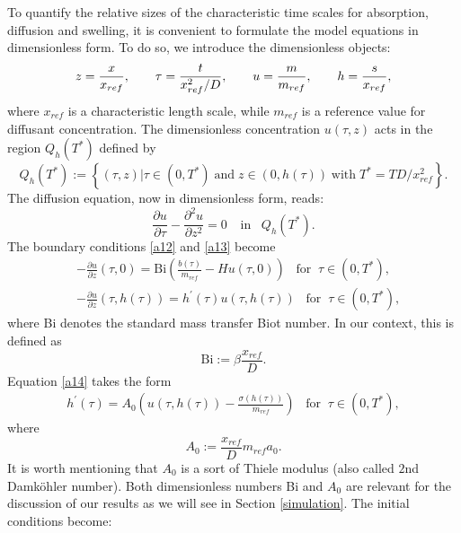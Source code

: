 \documentclass{article}
\begin{document}
To quantify the relative sizes of the characteristic time scales for absorption, diffusion and swelling, it is convenient to formulate the model equations in dimensionless form.  To do so, we introduce the dimensionless objects: 
\begin{align} 
\label{a17} z = \frac{x}{x_{ref}}, \hspace{7mm}  \tau = \frac{t}{x_{ref}^2/D}, \hspace{7mm}
u = \frac{m}{m_{ref}}, \hspace{7mm} h = \frac{s}{x_{ref}},
\end{align}
where  $x_{ref}$ is a characteristic  length scale,  while $m_{ref}$ is  a reference value for diffusant concentration.
The dimensionless concentration $u(\tau, z)$ acts in the region $Q_h(T^*)$  defined by $$ Q_h(T^*):= \left\{ (\tau, z) | \tau \in (0, T^*) \; \text{and}\; z \in (0, h(\tau)) \;\text{with}\; T^* = TD/x_{ref}^2 \right\}.$$
The   diffusion equation, now in dimensionless form, reads:
\begin{equation}
\label{a18} \frac{\partial u}{\partial \tau}  - \frac{\partial ^2 u}{\partial z^2} = 0 \;\;\; \ \text{in}\;\;\; Q_h(T^*).
\end{equation}
The boundary conditions \eqref{a12} and \eqref{a13} become
\begin{align}
\label{a19}& -\frac{\partial u}{\partial z}(\tau, 0) = \text{Bi} \left(\frac{b(\tau)}{m_{ref}} - Hu(\tau, 0)\right) \;\;\; \text{for}\;\; \tau\in(0, T^*), \\
\label{a20}&-\frac{\partial u}{\partial z}\left(\tau, h(\tau)\right) =h^{\prime}(\tau) u\left(\tau, h(\tau)\right)   \;\;\; \text{for}\;\; \tau\in(0, T^*),
\end{align}
where  Bi denotes the standard  mass transfer Biot number. In our context, this is defined as  \begin{equation} \label{Bi} \text{Bi} := \beta \frac{x_{ref}}{D}.\end{equation}
Equation \eqref{a14} takes the form
\begin{align}
\label{a21}h^{\prime}(\tau) = A_0 \left( u \left(\tau, h(\tau)\right) - \frac{\sigma(h(\tau))}{m_{ref}}\right)   \;\;\; \text{for}\;\; \tau\in(0, T^*),
\end{align}
where \begin{equation}\label{A0} A_0 :=  \frac{x_{ref}}{D}m_{ref} a_0. \end{equation} It is worth mentioning that $A_0$ is a sort of Thiele modulus (also called $2$nd Damk{\"o}hler number). Both dimensionless numbers Bi and $A_0$ are relevant for the discussion of our results as we will see in Section \ref{simulation}. The initial conditions become:
\end{document}
